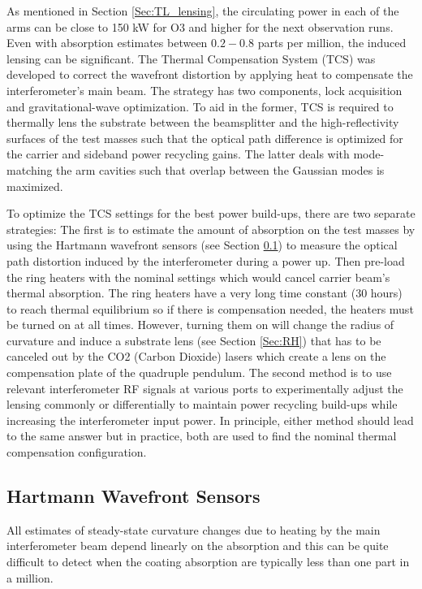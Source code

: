 	As mentioned in Section \ref{Sec:TL_lensing}, the circulating power in each of the arms can be close to 150 kW for O3 and higher for the next observation runs.  Even with absorption estimates between $0.2-0.8$ parts per million, the induced lensing can be significant.  The Thermal Compensation System (TCS) \cite{Lawrence_TCS} \cite{AWC_current} was developed to correct the wavefront distortion by applying heat to compensate the interferometer's main beam.  The strategy has two components, lock acquisition and gravitational-wave optimization.  To aid in the former, TCS is required to thermally lens the substrate between the beamsplitter and the high-reflectivity surfaces of the test masses such that the optical path difference is optimized for the carrier and sideband power recycling gains.  The latter deals with mode-matching the arm cavities such that overlap between the Gaussian modes is maximized.
	
	To optimize the TCS settings for the best power build-ups, there are two separate strategies:  The first is to estimate the amount of absorption on the test masses by using the Hartmann wavefront sensors (see Section \ref{Sec:HWS}) to measure the optical path distortion induced by the interferometer during a power up.  Then pre-load the ring heaters with the nominal settings which would cancel carrier beam's thermal absorption.  The ring heaters have a very long time constant (30 hours) to reach thermal equilibrium so if there is compensation needed, the heaters must be turned on at all times.    However, turning them on will change the radius of curvature and induce a substrate lens (see Section \ref{Sec:RH}) that has to be canceled out by the CO2 (Carbon Dioxide) lasers which create a lens on the compensation plate of the quadruple pendulum. The second method is to use relevant interferometer RF signals at various ports to experimentally adjust the lensing commonly or differentially to maintain power recycling build-ups while increasing the interferometer input power.  In principle, either method should lead to the same answer but in practice, both are used to find the nominal thermal compensation configuration.

	\subsection{Hartmann Wavefront Sensors}\label{Sec:HWS}
	All estimates of steady-state curvature changes due to heating by the main interferometer beam depend linearly on the absorption and this can be quite difficult to detect when the coating absorption are typically less than one part in a million.
	
